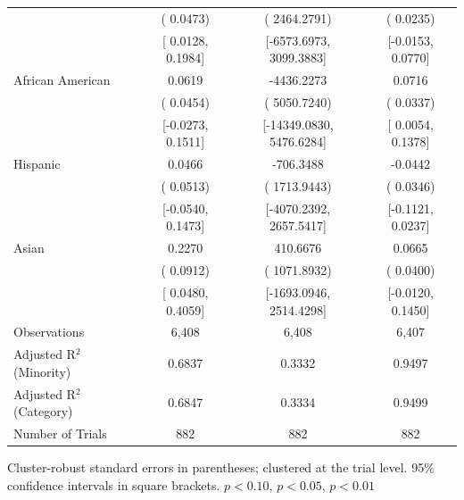 \begin{table}[!htbp]
{\begin{tabular}{lccc}
 & ( 0.0473) & ( 2464.2791) & ( 0.0235)  \\
 & [ 0.0128,  0.1984] & [-6573.6973,  3099.3883] & [-0.0153,  0.0770]  \\
African American &  0.0619 & -4436.2273 &  0.0716\sym{**}  \\
 & ( 0.0454) & ( 5050.7240) & ( 0.0337)  \\
 & [-0.0273,  0.1511] & [-14349.0830,  5476.6284] & [ 0.0054,  0.1378]  \\
Hispanic &  0.0466 & -706.3488 & -0.0442  \\
 & ( 0.0513) & ( 1713.9443) & ( 0.0346)  \\
 & [-0.0540,  0.1473] & [-4070.2392,  2657.5417] & [-0.1121,  0.0237]  \\
Asian &  0.2270\sym{**} &  410.6676 &  0.0665\sym{*}  \\
 & ( 0.0912) & ( 1071.8932) & ( 0.0400)  \\
 & [ 0.0480,  0.4059] & [-1693.0946,  2514.4298] & [-0.0120,  0.1450]  \\
\midrule
Observations & 6{,}408 & 6{,}408 & 6{,}407\\
Adjusted R$^2$ (Minority) & 0.6837 & 0.3332 & 0.9497\\
Adjusted R$^2$ (Category) & 0.6847 & 0.3334 & 0.9499\\
Number of Trials & 882 & 882 & 882\\
\bottomrule
\end{tabular}
}
\begin{minipage}{\textwidth}
\footnotesize
Cluster-robust standard errors in parentheses; clustered at the trial level. 95\% confidence intervals in square brackets.
\sym{*} \(p<0.10\), \sym{**} \(p<0.05\), \sym{***} \(p<0.01\)
\end{minipage}
\end{table}

